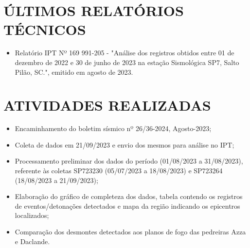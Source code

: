 \pagestyle{geral}
\section{ÚLTIMOS RELATÓRIOS TÉCNICOS}
\label{sec:ultimos_relatorios}
\begin{itemize}
    \item Relatório IPT Nº 169 991-205 - "Análise dos registros obtidos entre 01 de dezembro de 2022 e 30 de junho de 2023 na estação Sismológica SP7, Salto Pilão, SC.", emitido em agosto de 2023. 
\end{itemize}

\section{ATIVIDADES REALIZADAS}
\label{sec:atividade}
\begin{itemize}
    \item Encaminhamento do boletim sísmico nº 26/36-2024, Agosto-2023;
    \item Coleta de dados em 21/09/2023 e envio dos mesmos para análise no IPT;
    \item Processamento preliminar dos dados do período (01/08/2023 a 31/08/2023), referente às coletas SP723230 (05/07/2023 a 18/08/2023) e SP723264 (18/08/2023 a 21/09/2023); 
    \item Elaboração do gráfico de completeza dos dados, tabela contendo os registros de eventos/detonações detectados e mapa da região indicando os epicentros localizados;
	\item  Comparação dos desmontes detectados aos planos de fogo das pedreiras Azza e Daclande.
\end{itemize}

